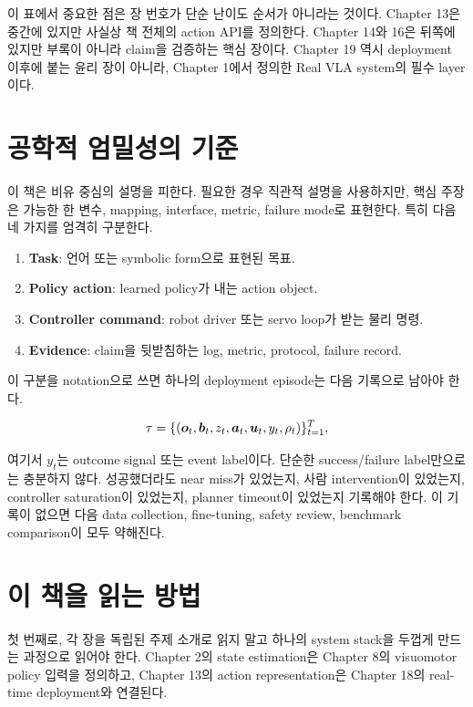 이 표에서 중요한 점은 장 번호가 단순 난이도 순서가 아니라는 것이다. Chapter 13은 중간에 있지만 사실상 책 전체의 action API를 정의한다. Chapter 14와 16은 뒤쪽에 있지만 부록이 아니라 claim을 검증하는 핵심 장이다. Chapter 19 역시 deployment 이후에 붙는 윤리 장이 아니라, Chapter 1에서 정의한 Real VLA system의 필수 layer이다.

\section{공학적 엄밀성의 기준}

이 책은 비유 중심의 설명을 피한다. 필요한 경우 직관적 설명을 사용하지만, 핵심 주장은 가능한 한 변수, mapping, interface, metric, failure mode로 표현한다. 특히 다음 네 가지를 엄격히 구분한다.

\begin{enumerate}
  \item \textbf{Task}: 언어 또는 symbolic form으로 표현된 목표.
  \item \textbf{Policy action}: learned policy가 내는 action object.
  \item \textbf{Controller command}: robot driver 또는 servo loop가 받는 물리 명령.
  \item \textbf{Evidence}: claim을 뒷받침하는 log, metric, protocol, failure record.
\end{enumerate}

이 구분을 notation으로 쓰면 하나의 deployment episode는 다음 기록으로 남아야 한다.

\begin{equation}
  \tau =
  \{(\bm{o}_t, \bm{b}_t, z_t, \bm{a}_t, \bm{u}_t, y_t, \rho_t)\}_{t=1}^{T},
  \label{eq:ch0-episode-record}
\end{equation}

여기서 $y_t$는 outcome signal 또는 event label이다. 단순한 success/failure label만으로는 충분하지 않다. 성공했더라도 near miss가 있었는지, 사람 intervention이 있었는지, controller saturation이 있었는지, planner timeout이 있었는지 기록해야 한다. 이 기록이 없으면 다음 data collection, fine-tuning, safety review, benchmark comparison이 모두 약해진다.

\section{이 책을 읽는 방법}

첫 번째로, 각 장을 독립된 주제 소개로 읽지 말고 하나의 system stack을 두껍게 만드는 과정으로 읽어야 한다. Chapter 2의 state estimation은 Chapter 8의 visuomotor policy 입력을 정의하고, Chapter 13의 action representation은 Chapter 18의 real-time deployment와 연결된다.

